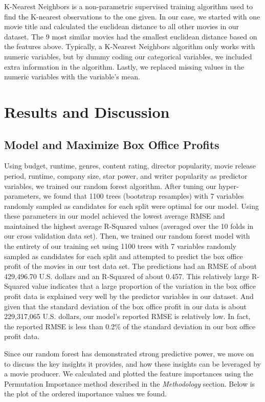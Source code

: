 \documentclass[10pt]{article}
\begin{document}
K-Nearest Neighbors is a non-parametric supervised training algorithm used to find the K-nearest observations to the one given. In our case, we started with one movie title and calculated the euclidean distance to all other movies in our dataset. The 9 most similar movies had the smallest euclidean distance based on the features above. Typically, a K-Nearest Neighbors algorithm only works with numeric variables, but by dummy coding our categorical variables, we included extra information in the algorithm. Lastly, we replaced missing values in the numeric variables with the variable’s mean. 

\section{Results and Discussion}
\subsection{Model and Maximize Box Office Profits}

Using budget, runtime, genres, content rating, director popularity, movie release period, runtime, company size, star power, and writer popularity as predictor variables, we trained our random forest algorithm. After tuning our hyper-parameters, we found that 1100 trees (bootstrap resamples) with 7 variables randomly sampled as candidates for each split were optimal for our model. Using these parameters in our model achieved the lowest average RMSE and maintained the highest average R-Squared values (averaged over the 10 folds in our cross validation data set). Then, we trained our random forest model with the entirety of our training set using 1100 trees with 7 variables randomly sampled as candidates for each split and attempted to predict the box office profit of the movies in our test data set. The predictions had an RMSE of about 429,496.70 U.S. dollars and an R-Squared of about 0.457. This relatively large R-Squared value indicates that a large proportion of the variation in the box office profit data is explained very well by the predictor variables in our dataset. And given that the standard deviation of the box office profit in our data is about 229,317,065 U.S. dollars, our model’s reported RMSE is relatively low. In fact, the reported RMSE is less than 0.2\% of the standard deviation in our box office profit data.

Since our random forest has demonstrated strong predictive power, we move on to discuss the key insights it provides, and how these insights can be leveraged by a movie producer. We calculated and plotted the feature importances using the Permutation Importance method described in the \textit{Methodology} section. Below is the plot of the ordered importance values we found. 
\end{document}
